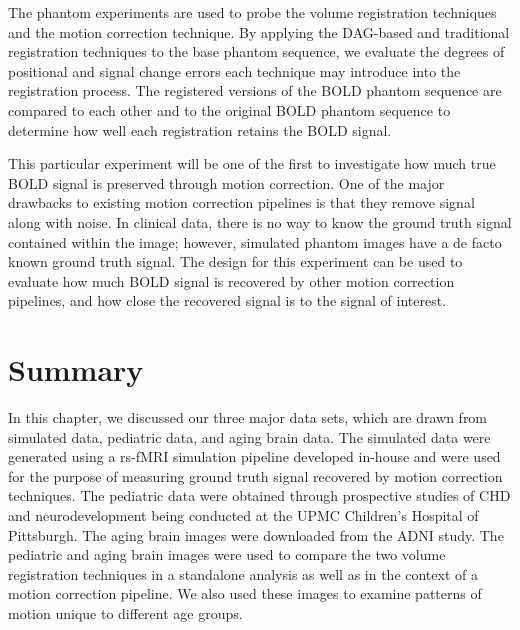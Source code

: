 The phantom experiments are used to probe the volume registration techniques and the motion correction technique. By applying the DAG-based and traditional registration techniques to the base phantom sequence, we evaluate the degrees of positional and signal change errors each technique may introduce into the registration process. The registered versions of the BOLD phantom sequence are compared to each other and to the original BOLD phantom sequence to determine how well each registration retains the BOLD signal.

This particular experiment will be one of the first to investigate how much true BOLD signal is preserved through motion correction. One of the major drawbacks to existing motion correction pipelines is that they remove signal along with noise. In clinical data, there is no way to know the ground truth signal contained within the image; however, simulated phantom images have a de facto known ground truth signal. The design for this experiment can be used to evaluate how much BOLD signal is recovered by other motion correction pipelines, and how close the recovered signal is to the signal of interest.

\section{Summary}

In this chapter, we discussed our three major data sets, which are drawn from simulated data, pediatric data, and aging brain data. The simulated data were generated using a rs-fMRI simulation pipeline developed in-house and were used for the purpose of measuring ground truth signal recovered by motion correction techniques. The pediatric data were obtained through prospective studies of CHD and neurodevelopment being conducted at the UPMC Children's Hospital of Pittsburgh. The aging brain images were downloaded from the ADNI study. The pediatric and aging brain images were used to compare the two volume registration techniques in a standalone analysis as well as in the context of a motion correction pipeline. We also used these images to examine patterns of motion unique to different age groups. 
